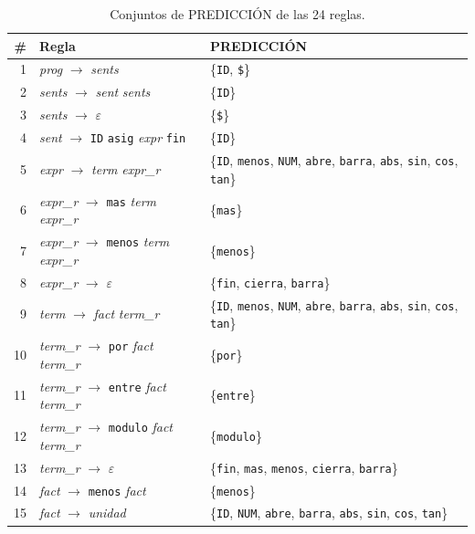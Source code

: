 \documentclass[12pt,letterpaper]{article}
\begin{document}
\begin{table}[H]
\centering
\caption{Conjuntos de PREDICCIÓN de las 24 reglas.}
\footnotesize
\begin{tabular}{r l p{6.0cm}}
\toprule
\# & Regla & PREDICCIÓN \\
\midrule
1 & \textit{prog} $\rightarrow$ \textit{sents} & \{\texttt{ID}, \texttt{\$}\} \\
2 & \textit{sents} $\rightarrow$ \textit{sent} \textit{sents} & \{\texttt{ID}\} \\
3 & \textit{sents} $\rightarrow$ $\varepsilon$ & \{\texttt{\$}\} \\
4 & \textit{sent} $\rightarrow$ \texttt{ID} \texttt{asig} \textit{expr} \texttt{fin} & \{\texttt{ID}\} \\
5 & \textit{expr} $\rightarrow$ \textit{term} \textit{expr\_r} & \{\texttt{ID}, \texttt{menos}, \texttt{NUM}, \texttt{abre}, \texttt{barra}, \texttt{abs}, \texttt{sin}, \texttt{cos}, \texttt{tan}\} \\
6 & \textit{expr\_r} $\rightarrow$ \texttt{mas} \textit{term} \textit{expr\_r} & \{\texttt{mas}\} \\
7 & \textit{expr\_r} $\rightarrow$ \texttt{menos} \textit{term} \textit{expr\_r} & \{\texttt{menos}\} \\
8 & \textit{expr\_r} $\rightarrow$ $\varepsilon$ & \{\texttt{fin}, \texttt{cierra}, \texttt{barra}\} \\
9 & \textit{term} $\rightarrow$ \textit{fact} \textit{term\_r} & \{\texttt{ID}, \texttt{menos}, \texttt{NUM}, \texttt{abre}, \texttt{barra}, \texttt{abs}, \texttt{sin}, \texttt{cos}, \texttt{tan}\} \\
10 & \textit{term\_r} $\rightarrow$ \texttt{por} \textit{fact} \textit{term\_r} & \{\texttt{por}\} \\
11 & \textit{term\_r} $\rightarrow$ \texttt{entre} \textit{fact} \textit{term\_r} & \{\texttt{entre}\} \\
12 & \textit{term\_r} $\rightarrow$ \texttt{modulo} \textit{fact} \textit{term\_r} & \{\texttt{modulo}\} \\
13 & \textit{term\_r} $\rightarrow$ $\varepsilon$ & \{\texttt{fin}, \texttt{mas}, \texttt{menos}, \texttt{cierra}, \texttt{barra}\} \\
14 & \textit{fact} $\rightarrow$ \texttt{menos} \textit{fact} & \{\texttt{menos}\} \\
15 & \textit{fact} $\rightarrow$ \textit{unidad} & \{\texttt{ID}, \texttt{NUM}, \texttt{abre}, \texttt{barra}, \texttt{abs}, \texttt{sin}, \texttt{cos}, \texttt{tan}\} \\

\end{tabular}
\end{table}
\end{document}
